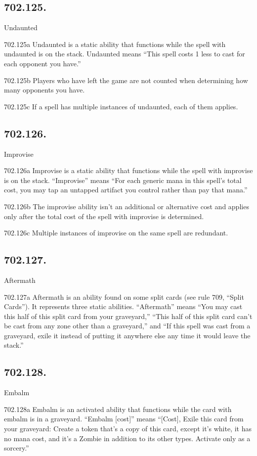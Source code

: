 \subsection*{702.125.}
Undaunted

702.125a Undaunted is a static ability that functions while the spell with undaunted is on the stack. Undaunted means “This spell costs {1} less to cast for each opponent you have.”

702.125b Players who have left the game are not counted when determining how many opponents you have.

702.125c If a spell has multiple instances of undaunted, each of them applies.

\subsection*{702.126.}
Improvise

702.126a Improvise is a static ability that functions while the spell with improvise is on the stack. “Improvise” means “For each generic mana in this spell’s total cost, you may tap an untapped artifact you control rather than pay that mana.”

702.126b The improvise ability isn’t an additional or alternative cost and applies only after the total cost of the spell with improvise is determined.

702.126c Multiple instances of improvise on the same spell are redundant.

\subsection*{702.127.}
Aftermath

702.127a Aftermath is an ability found on some split cards (see rule 709, “Split Cards”). It represents three static abilities. “Aftermath” means “You may cast this half of this split card from your graveyard,” “This half of this split card can’t be cast from any zone other than a graveyard,” and “If this spell was cast from a graveyard, exile it instead of putting it anywhere else any time it would leave the stack.”

\subsection*{702.128.}
Embalm

702.128a Embalm is an activated ability that functions while the card with embalm is in a graveyard. “Embalm [cost]” means “[Cost], Exile this card from your graveyard: Create a token that’s a copy of this card, except it’s white, it has no mana cost, and it’s a Zombie in addition to its other types. Activate only as a sorcery.”

